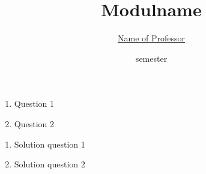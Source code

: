


\title{Modulname}
\date{semester}
\author{\href{mailto:name@adress}{Name of Professor}}


\newcommand{\sheetnumber}{1}
\newcommand{\publishdate}{09.10.2019}
\newcommand{\handindate}{16.10.2019, 10:00 pm}
\setcounter{question}{0}




\begin{question}[subtitle={nice excercise}]
  \begin{enumerate}
    \item Question 1
    \item Question 2
  \end{enumerate}
\end{question}

\begin{solution}
  \begin{enumerate}
    \item Solution question 1
    \item Solution question 2
  \end{enumerate}
\end{solution}


